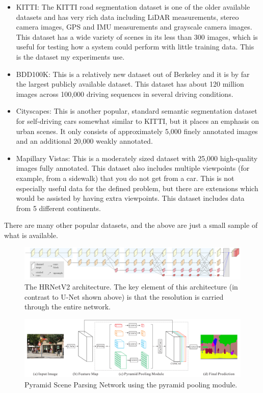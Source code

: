 \documentclass[10pt,twocolumn,letterpaper]{article}
\begin{document}
\begin{itemize}
    \item KITTI: The KITTI road segmentation dataset is one of the older available datasets and has very rich data including LiDAR measurements, stereo camera images, GPS and IMU measurements and grayscale camera images. This dataset has a wide variety of scenes in its less than 300 images, which is useful for testing how a system could perform with little training data. This is the dataset my experiments use.\cite{Fritsch13}
    \item BDD100K: This is a relatively new dataset out of Berkeley and it is by far the largest publicly available dataset. This dataset has about 120 million images across 100,000 driving sequences in several driving conditions. \cite{yu18}
    \item Cityscapes: This is another popular, standard semantic segmentation dataset for self-driving cars somewhat similar to KITTI, but it places an emphasis on urban scenes. It only consists of approximately 5,000 finely annotated images and an additional 20,000 weakly annotated. \cite{Cordts16}
    \item Mapillary Vistas: This is a moderately sized dataset with 25,000 high-quality images fully annotated. This dataset also includes multiple viewpoints (for example, from a sidewalk) that you do not get from a car. This is not especially useful data for the defined problem, but there are extensions which would be assisted by having extra viewpoints. This dataset includes data from 5 different continents. \cite{Neuhold17} 
\end{itemize}

There are many other popular datasets, and the above are just a small sample of what is available.
\begin{figure}[h]
\begin{center}
    \includegraphics[width=\linewidth]{images/seg-hrnet.png}
\end{center}
   \caption{The HRNetV2 architecture. The key element of this architecture (in contrast to U-Net shown above) is that the resolution is carried through the entire network.}
\label{fig:hrnet}
\end{figure}

\begin{figure}[h]
\begin{center}
    \includegraphics[width=\linewidth]{images/PSP.png}
\end{center}
   \caption{Pyramid Scene Parsing Network using the pyramid pooling module.\cite{Zhao17}}
\label{fig:PSP}
\end{figure}
\end{document}
